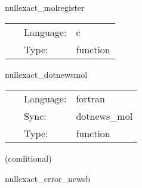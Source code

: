 \vspace{5mm}


\hspace{5mm} nullexact\_molregister 

\hspace{5mm}{\it register variables for mol } 


\hspace{5mm}

 \begin{tabular*}{160mm}{cll} 
~ & Language:  & c \\ 
~ & Type:  & function \\ 
\end{tabular*} 


\vspace{5mm}


\hspace{5mm} nullexact\_dotnewsmol 

\hspace{5mm}{\it calculate the integral of psi4 } 


\hspace{5mm}

 \begin{tabular*}{160mm}{cll} 
~ & Language:  & fortran \\ 
~ & Sync:  & dotnews\_mol \\ 
~ & Type:  & function \\ 
\end{tabular*} 


\vspace{5mm}

   (conditional) 

\hspace{5mm} nullexact\_error\_newsb 

\hspace{5mm}{\it error in characteristic evolution variables } 


\hspace{5mm}

